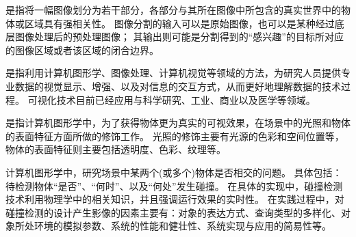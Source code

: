 \begin{definition}[经皮介入血管成形术]
\end{definition}

\begin{definition}[图像分割]
是指将一幅图像划分为若干部分，各部分与其所在图像中所包含的真实世界中的物体或区域具有强相关性。
图像分割的输入可以是原始图像，也可以是某种经过底层图像处理后的预处理图像；
其输出则可能是分割得到的“感兴趣”的目标所对应的图像区域或者该区域的闭合边界\cite{Sonka2008ImageBook}\cite{Wang2008ImageBook}。
\end{definition}

\begin{definition}[可视化]
是指利用计算机图形学、图像处理、计算机视觉等领域的方法，为研究人员提供专业数据的视觉显示、增强、以及对信息的交互方式，从而更好地理解数据的技术过程。
可视化技术目前已经应用与科学研究、工业、商业以及医学等领域\cite{Hearn2004CGBook}。
\end{definition}

\begin{definition}[渲染]
是指计算机图形学中，为了获得物体更为真实的可视效果，在场景中的光照和物体的表面特征方面所做的修饰工作。
光照的修饰主要有光源的色彩和空间位置等，物体的表面特征则主要包括透明度、色彩、纹理等\cite{Hearn2004CGBook}。
\end{definition}

\begin{definition}[碰撞检测]
计算机图形学中，研究场景中某两个(或多个)物体是否相交的问题。
具体包括：待检测物体“是否”、“何时”、以及“何处”发生碰撞。
在具体的实现中，碰撞检测技术利用物理学中的相关知识，并且强调运行效果的实时性。
在实践过程中，对碰撞检测的设计产生影像的因素主要有：对象的表达方式、查询类型的多样化、对象所处环境的模拟参数、系统的性能和健壮性、系统实现与应用的简易性等\cite{Ericson2005CDBook}。
\end{definition}

